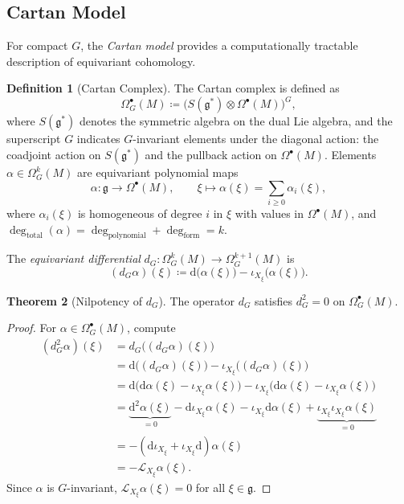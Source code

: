 \documentclass[10pt]{article}
\theoremstyle{definition}
\newtheorem{definition}{Definition}[section]
\newtheorem{theorem}[definition]{Theorem}
\newcommand{\diff}{\mathrm{d}}
\newcommand{\lie}[1]{\mathcal{L}_{#1}}
\newcommand{\cont}[1]{\iota_{#1}}
\begin{document}
\subsection{Cartan Model}\label{subsec:cartan}
For compact $G$, the \emph{Cartan model} provides a computationally tractable description of equivariant cohomology.

\begin{definition}[Cartan Complex]
The Cartan complex is defined as
\begin{equation}\label{eq:cartan-complex}
    \Omega^{\bullet}_{G}(M) \coloneqq \bigl(S(\mathfrak{g}^{*}) \otimes \Omega^{\bullet}(M)\bigr)^{G},
\end{equation}
where $S(\mathfrak{g}^{*})$ denotes the symmetric algebra on the dual Lie algebra, and the superscript $G$ indicates $G$-invariant elements under the diagonal action: the coadjoint action on $S(\mathfrak{g}^{*})$ and the pullback action on $\Omega^{\bullet}(M)$. Elements $\alpha \in \Omega^{k}_{G}(M)$ are equivariant polynomial maps
\begin{equation}\label{eq:polynomial-map}
    \alpha: \mathfrak{g} \longrightarrow \Omega^{\bullet}(M), \qquad \xi \longmapsto \alpha(\xi) = \sum_{i \ge 0} \alpha_{i}(\xi),
\end{equation}
where $\alpha_{i}(\xi)$ is homogeneous of degree $i$ in $\xi$ with values in $\Omega^{\bullet}(M)$, and $\deg_{\text{total}}(\alpha) = \deg_{\text{polynomial}} + \deg_{\text{form}} = k$.
\end{definition}

The \emph{equivariant differential} $d_{G}: \Omega^{k}_{G}(M) \to \Omega^{k+1}_{G}(M)$ is
\begin{equation}\label{eq:equivariant-differential}
    (d_{G}\alpha)(\xi) \coloneqq \diff\bigl(\alpha(\xi)\bigr) - \cont{X_{\xi}}\bigl(\alpha(\xi)\bigr).
\end{equation}

\begin{theorem}[Nilpotency of $d_G$]
The operator $d_G$ satisfies $d_G^2 =0$ on $\Omega_G^\bullet(M)$.
\end{theorem}
\begin{proof}
For $\alpha \in \Omega_G^\bullet(M)$, compute
\begin{align*}
(d_G^2 \alpha)(\xi) &= d_G\bigl((d_G\alpha)(\xi)\bigr) \\
&= \diff\bigl((d_G\alpha)(\xi)\bigr) - \cont{X_\xi}\bigl((d_G\alpha)(\xi)\bigr) \\
&= \diff\bigl(\diff\alpha(\xi) - \cont{X_\xi}\alpha(\xi)\bigr) - \cont{X_\xi}\bigl(\diff\alpha(\xi) - \cont{X_\xi}\alpha(\xi)\bigr) \\
&= \underbrace{\diff^2\alpha(\xi)}_{=0} - \diff\cont{X_\xi}\alpha(\xi) - \cont{X_\xi}\diff\alpha(\xi) + \underbrace{\cont{X_\xi}\cont{X_\xi}\alpha(\xi)}_{=0} \\
&= -(\diff\cont{X_\xi} + \cont{X_\xi}\diff)\alpha(\xi) \\
&= -\lie{X_\xi}\alpha(\xi).
\end{align*}
Since $\alpha$ is $G$-invariant, $\lie{X_\xi}\alpha(\xi) = 0$ for all $\xi \in \mathfrak{g}$.
\end{proof}
\end{document}
